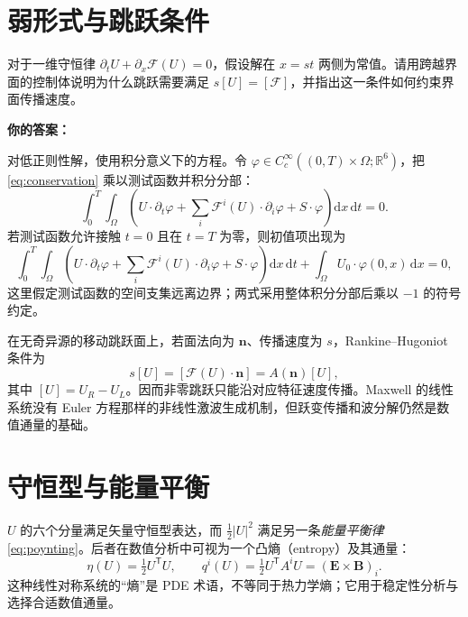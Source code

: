 \documentclass[UTF8,11pt,openany]{ctexbook}
\numberwithin{equation}{chapter}
\theoremstyle{definition}
\theoremstyle{remark}
\newcommand{\dd}{\mathrm d}
\newcommand{\RR}{\mathbb R}
\begin{document}
\section{弱形式与跳跃条件}
\begin{studentinput}
对于一维守恒律 $\partial_tU+\partial_x\mathcal F(U)=0$，假设解在 $x=st$ 两侧为常值。请用跨越界面的控制体说明为什么跳跃需要满足 $s[U]=[\mathcal F]$，并指出这一条件如何约束界面传播速度。

\textbf{你的答案：}\vspace{2cm}
\end{studentinput}
对低正则性解，使用积分意义下的方程。令 $\varphi\in C_c^\infty((0,T)\times\Omega;\RR^6)$，把 \eqref{eq:conservation} 乘以测试函数并积分分部：
\begin{equation}\label{eq:weakinternal}
\int_0^T\!\int_\Omega
\left(U\cdot\partial_t\varphi+
\sum_i\mathcal F^i(U)\cdot\partial_i\varphi+S\cdot\varphi\right)\dd x\,\dd t=0.
\end{equation}
若测试函数允许接触 $t=0$ 且在 $t=T$ 为零，则初值项出现为
\begin{equation}\label{eq:weakinit}
\int_0^T\!\int_\Omega
\left(U\cdot\partial_t\varphi+
\sum_i\mathcal F^i(U)\cdot\partial_i\varphi+S\cdot\varphi\right)\dd x\,\dd t
+\int_\Omega U_0\cdot\varphi(0,x)\,\dd x=0,
\end{equation}
这里假定测试函数的空间支集远离边界；两式采用整体积分分部后乘以 $-1$ 的符号约定。

在无奇异源的移动跳跃面上，若面法向为 $\bm n$、传播速度为 $s$，Rankine--Hugoniot 条件为
\begin{equation}\label{eq:RH}
s[U]=[\mathcal F(U)\cdot\bm n]=A(\bm n)[U],
\end{equation}
其中 $[U]=U_R-U_L$。因而非零跳跃只能沿对应特征速度传播。Maxwell 的线性系统没有 Euler 方程那样的非线性激波生成机制，但跃变传播和波分解仍然是数值通量的基础。

\section{守恒型与能量平衡}
$U$ 的六个分量满足矢量守恒型表达，而 $\tfrac12|U|^2$ 满足另一条\emph{能量平衡律} \eqref{eq:poynting}。后者在数值分析中可视为一个凸熵（entropy）及其通量：
\begin{equation}
\eta(U)=\tfrac12 U^\mathsf TU,\qquad
q^i(U)=\tfrac12 U^\mathsf TA^iU=(\bm E\times\bm B)_i.
\end{equation}
这种线性对称系统的“熵”是 PDE 术语，不等同于热力学熵；它用于稳定性分析与选择合适数值通量。
\end{document}
